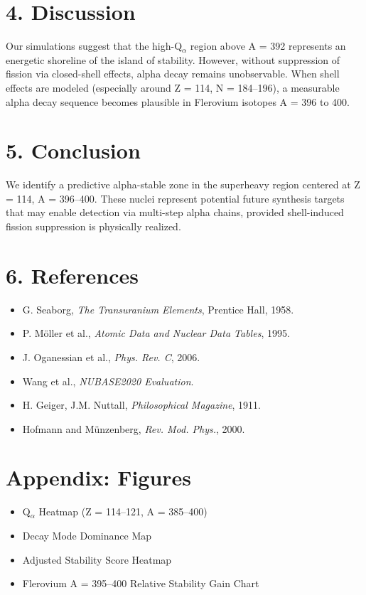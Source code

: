 \documentclass[12pt]{article}
\begin{document}
\section*{4. Discussion}
Our simulations suggest that the high-Q$_\alpha$ region above A = 392 represents an energetic shoreline of the island of stability. However, without suppression of fission via closed-shell effects, alpha decay remains unobservable. When shell effects are modeled (especially around Z = 114, N = 184--196), a measurable alpha decay sequence becomes plausible in Flerovium isotopes A = 396 to 400.

\section*{5. Conclusion}
We identify a predictive alpha-stable zone in the superheavy region centered at Z = 114, A = 396--400. These nuclei represent potential future synthesis targets that may enable detection via multi-step alpha chains, provided shell-induced fission suppression is physically realized.

\section*{6. References}
\begin{itemize}
\item G. Seaborg, \textit{The Transuranium Elements}, Prentice Hall, 1958.
\item P. M\"oller et al., \textit{Atomic Data and Nuclear Data Tables}, 1995.
\item J. Oganessian et al., \textit{Phys. Rev. C}, 2006.
\item Wang et al., \textit{NUBASE2020 Evaluation}.
\item H. Geiger, J.M. Nuttall, \textit{Philosophical Magazine}, 1911.
\item Hofmann and M\"unzenberg, \textit{Rev. Mod. Phys.}, 2000.
\end{itemize}

\section*{Appendix: Figures}
\begin{itemize}
\item Q$_\alpha$ Heatmap (Z = 114--121, A = 385--400)
\item Decay Mode Dominance Map
\item Adjusted Stability Score Heatmap
\item Flerovium A = 395--400 Relative Stability Gain Chart
\end{itemize}
\end{document}
